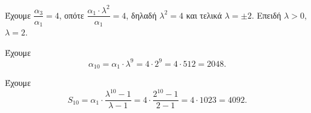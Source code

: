 
\begin{alist}
\item Έχουμε
$\dfrac{\alpha_3}{\alpha_1} = 4$, οπότε $\dfrac{\alpha_1 \cdot \lambda^2}{\alpha_1} = 4$, δηλαδή $\lambda^2 = 4$ και τελικά $\lambda = \pm 2$.
Επειδή $\lambda > 0$, $\lambda = 2$.

\item Έχουμε
\[\alpha_{10} = \alpha_1 \cdot \lambda^9 = 4 \cdot 2^9 = 4 \cdot 512 = 2048.\]

\item Έχουμε
\[S_{10} = \alpha_1 \cdot \dfrac{\lambda^{10} - 1}{\lambda - 1} = 4 \cdot \dfrac{2^{10} - 1}{2 - 1} = 4 \cdot 1023 = 4092.\]
\end{alist}

